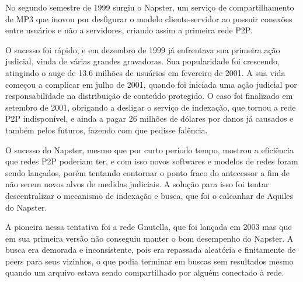 No segundo semestre de 1999 surgiu o Napster, um serviço de compartilhamento de MP3 que inovou por desfigurar o modelo cliente-servidor ao possuir conexões entre usuários e não a servidores, criando assim a primeira rede P2P.

O sucesso foi rápido, e em dezembro de 1999 já enfrentava sua primeira ação judicial, vinda de várias grandes gravadoras. Sua popularidade foi crescendo, atingindo o auge de 13.6 milhões de usuários em fevereiro de 2001. A sua vida começou a complicar em julho de 2001, quando foi iniciada uma ação judicial por responsabilidade na distribuição de conteúdo protegido. O caso foi finalizado em setembro de 2001, obrigando a desligar o serviço de indexação, que tornou a rede P2P indisponível, e ainda a pagar 26 milhões de dólares por danos já causados e também pelos futuros, fazendo com que pedisse falência.

O sucesso do Napster, mesmo que por curto período tempo, mostrou a eficiência que redes P2P poderiam ter, e com isso novos softwares e modelos de redes foram sendo lançados, porém tentando contornar o ponto fraco do antecessor a fim de não serem novos alvos de medidas judiciais. A solução para isso foi tentar descentralizar o mecanismo de indexação e busca, que foi o calcanhar de Aquiles do Napster.

A pioneira nessa tentativa foi a rede Gnutella, que foi lançada em 2003 mas que em sua primeira versão não conseguiu manter o bom desempenho do Napster. A busca era demorada e inconsistente, pois era repassada aleatória e finitamente de peers para seus vizinhos, o que podia terminar em buscas sem resultados mesmo quando um arquivo estava sendo compartilhado por alguém conectado à rede. 

